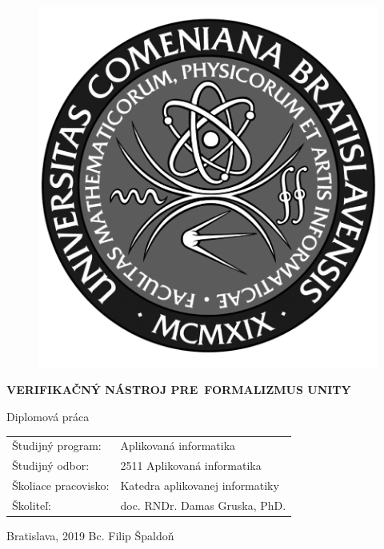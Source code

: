 \documentclass[12pt, a4paper, oneside]{book}
\newcommand\mftitle{Verifikačný nástroj pre formalizmus UNITY}
\newcommand\mfthesistype{Diplomová práca}
\newcommand\mfauthor{Bc. Filip Špaldoň}
\newcommand\mfadvisor{doc. RNDr. Damas Gruska, PhD.}
\newcommand\mfplacedate{Bratislava, 2019}
\begin{document}
\vfill
\begin{figure}[!hbt]
\begin{center}
\includegraphics{images/logo_fmph_dark}
\label{img:logo_dark}
\end{center}
\end{figure}
\begin{center}
\begin{minipage}{0.8\textwidth}
\centerline{\textbf{\Large\MakeUppercase{\mftitle}}}
\smallskip
\centerline{\mfthesistype}
\end{minipage}
\end{center}
\vfill
\begin{tabular}{l l}
Študijný program: & Aplikovaná informatika\\
Študijný odbor: & 2511 Aplikovaná informatika\\
Školiace pracovisko: & Katedra aplikovanej informatiky\\
Školiteľ: & \mfadvisor
\end{tabular}
\vfill
\noindent
\mfplacedate \hfill
\mfauthor
\eject 

\end{document}
